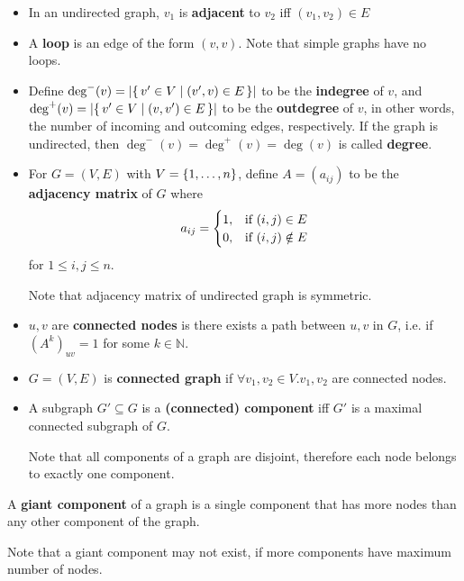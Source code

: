 \begin{definition}
    \begin{itemize}[leftmargin=*]
        \item In an undirected graph, $v_1$ is \textbf{adjacent} to $v_2$ iff $(v_1, v_2) \in E$
        \item A \textbf{loop} is an edge of the form $(v, v)$.
        Note that simple graphs have no loops.
        \item Define $\deg^-(v) = \left| \left\{\, v' \in V \mid (v', v) \in E \, \right\} \right|$ to be the \textbf{indegree} of $v$, and $\deg^+(v) = \left| \left\{\, v' \in V \mid (v, v') \in E \, \right\} \right|$ to be the \textbf{outdegree} of $v$, in other words, the number of incoming and outcoming edges, respectively.
        If the graph is undirected, then $\deg^-(v) = \deg^+(v) = \deg(v)$ is called \textbf{degree}.
        \item For $G = (V, E)$ with $V = \left\{1, \dots, n\right\}$, define $A = (a_{ij})$ to be the \textbf{adjacency matrix} of $G$ where
        \[ a_{ij} = \begin{cases}
                        1, & \textnormal{if}\ (i, j) \in E \\
                        0, & \textnormal{if}\ (i, j) \notin E
        \end{cases} \]
        for $1 \leq i, j \leq n$.

        Note that adjacency matrix of undirected graph is symmetric.
    \end{itemize}
\end{definition}

\begin{definition}[Connectedness]
    \begin{itemize}[leftmargin=*]
        \item $u, v$ are \textbf{connected nodes} is there exists a path between $u, v$ in $G$, i.e. if $(A^k)_{uv} = 1$ for some $k\in \mathbb{N}$.
        \item $G = (V, E)$ is \textbf{connected graph} if $\forall v_1, v_2 \in V. v_1, v_2$ are connected nodes.
        \item A subgraph $G' \subseteq G$ is a \textbf{(connected) component} iff $G'$ is a maximal connected subgraph of $G$.

        Note that all components of a graph are disjoint, therefore each node belongs to exactly one component.
    \end{itemize}

    \item A \textbf{giant component} of a graph is a single component that has more nodes than any other component of the graph.

    Note that a giant component may not exist, if more components have maximum number of nodes.
\end{definition}

